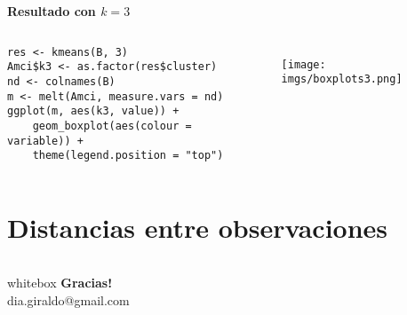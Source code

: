 \documentclass[10pt, aspectratio=169]{beamer}
\begin{document}
{
\begin{frame}[fragile]{}
\vspace{0.3cm}
\textcolor{UltraViolet}{\textbf{\large Resultado con $k=3$}} 
\begin{columns}
{\small
 \begin{verbatim}
res <- kmeans(B, 3)
Amci$k3 <- as.factor(res$cluster)
nd <- colnames(B)
m <- melt(Amci, measure.vars = nd)
ggplot(m, aes(k3, value)) + 
    geom_boxplot(aes(colour = variable)) + 
    theme(legend.position = "top")
\end{verbatim}}
 \pause
 \begin{figure}
 \texttt{[image: imgs/boxplots3.png]}
\end{figure}
\end{columns}
\end{frame}
}

\section{Distancias entre observaciones}


{
\begin{frame}[plain]
\begin{overlayarea}{0.9\textwidth}{9cm}
 \begin{columns}
  \vspace{6cm}
\begin{beamercolorbox}[sep=2mm]{whitebox}
 \textbf{\Huge Gracias!}\\
 \vspace{0.2cm}
 dia.giraldo@gmail.com
\end{beamercolorbox}
 \end{columns}
\end{overlayarea}
\end{frame}
}
\end{document}
